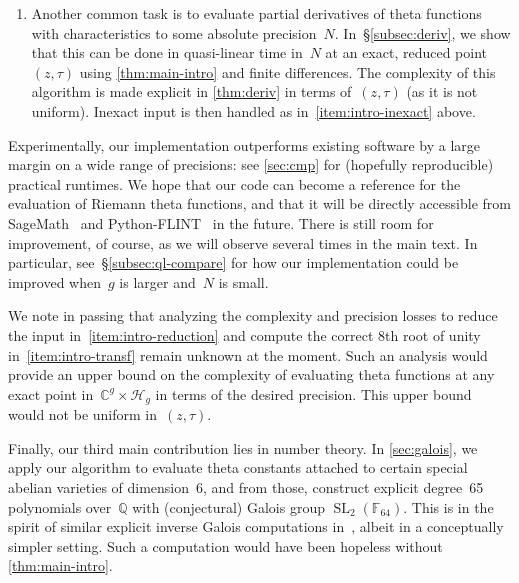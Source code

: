 \documentclass[12pt,oneside]{amsart}
\numberwithin{equation}{section}
\theoremstyle{definition}
\newcommand{\Q}{\mathbb{Q}}
\newcommand{\C}{\mathbb{C}}
\newcommand{\F}{\mathbb{F}}
\newcommand{\Half}{\mathcal{H}}
\DeclareMathOperator{\SL}{SL}
\DeclareMathOperator{\thetatilde}{\rlap{\raisebox{-0.1ex}{$\widetilde{\phantom{\,t}}$}}\theta}
\begin{document}
\begin{enumerate}
  the actual theta functions~$\theta_{a,b}$, not the modified
  ones~$\thetatilde_{a,b}$, and their input~$(z,\tau)$ might be inexact
  (e.g.~if reduction was performed). We handle this in FLINT by using
  \cref{thm:main-intro} on the center of~$(z,\tau)$, multiplying
  by~$\exp(\pi y^T Y^{-1} y)$, then using upper bounds on derivatives of theta
  functions obtained in~§\ref{sec:summation} to propagate errors.
\item Another common task is to evaluate partial derivatives of theta functions
  with characteristics to some absolute precision~$N$. In~§\ref{subsec:deriv},
  we show that this can be done in quasi-linear time in~$N$ at an exact,
  reduced point~$(z,\tau)$ using \cref{thm:main-intro} and finite differences.
  The complexity of this algorithm is made explicit in \cref{thm:deriv} in
  terms of~$(z,\tau)$ (as it is not uniform). Inexact input is then handled as
  in~\eqref{item:intro-inexact} above.
\end{enumerate}

Experimentally, our implementation outperforms existing software by a large
margin on a wide range of precisions: see \cref{sec:cmp} for (hopefully
reproducible) practical runtimes. We hope that our code can become a reference
for the evaluation of Riemann theta functions, and that it will be directly
accessible from SageMath~\cite{thesagedevelopersSageMathSageMathematics} and
Python-FLINT~\cite{johanssonPythonFLINTPythonBindings2025} in the future. There
is still room for improvement, of course, as we will observe several times in
the main text. In particular, see~§\ref{subsec:ql-compare} for how our
implementation could be improved when~$g$ is larger and~$N$ is small.

We note in passing that analyzing the complexity and precision losses to reduce
the input in~\eqref{item:intro-reduction} and compute the correct 8th root of
unity in~\eqref{item:intro-transf} remain unknown at the moment. Such an
analysis would provide an upper bound on the complexity of evaluating theta
functions at any exact point in~$\C^g\times \Half_g$ in terms of the desired
precision. This upper bound would not be uniform in~$(z,\tau)$.

Finally, our third main contribution lies in number theory. In
\cref{sec:galois}, we apply our algorithm to evaluate theta constants attached
to certain special abelian varieties of dimension~6, and from those, construct
explicit degree~65 polynomials over~$\Q$ with (conjectural) Galois group
$\SL_2(\F_{64})$. This is in the spirit of similar explicit inverse Galois
computations in~\cite{vanbommel17T7GaloisGroup2024}, albeit in a conceptually
simpler setting. Such a computation would have been hopeless without
\cref{thm:main-intro}.
\end{document}
